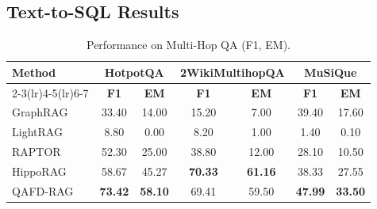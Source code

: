 \documentclass{article} %
\begin{document}
\subsection{Text-to-SQL Results}
\begin{table}[t]
\centering
\caption{
Performance on Multi-Hop QA (F1, EM).
}
\label{tab:multi-hop}
\begin{tabular}{lcccccc}
\toprule
\textbf{Method} 
& \multicolumn{2}{c}{\textbf{HotpotQA}}
& \multicolumn{2}{c}{\textbf{2WikiMultihopQA}}
& \multicolumn{2}{c}{\textbf{MuSiQue}} \\
\cmidrule(lr){2-3}\cmidrule(lr){4-5}\cmidrule(lr){6-7}
& \textbf{F1} & \textbf{EM}
& \textbf{F1} & \textbf{EM}
& \textbf{F1} & \textbf{EM} \\
\midrule

GraphRAG  
 & 33.40 & 14.00
 & 15.20 & 7.00
 & 39.40 & 17.60 \\

LightRAG  
 & 8.80 & 0.00
 & 8.20 & 1.00
 & 1.40 & 0.10 \\

RAPTOR
 & 52.30 & 25.00
 & 38.80 & 12.00
 & 28.10 & 10.50 \\

HippoRAG
 & 58.67 & 45.27
 & \textbf{70.33} & \textbf{61.16}
 & 38.33 & 27.55 \\

QAFD-RAG  
 & \textbf{73.42} & \textbf{58.10}
 & 69.41 & 59.50
 & \textbf{47.99} & \textbf{33.50} \\

\bottomrule
\end{tabular}
\vspace{-0.25cm}
\end{table}


\end{document}
